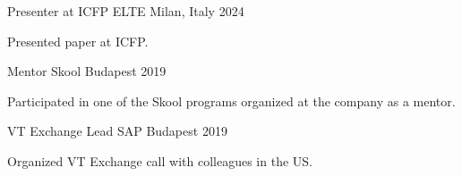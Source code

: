 

\begin{cventries}

  \cventry
    {Presenter at ICFP} %
    {ELTE}
    {Milan, Italy} %
    {2024} %
    {
      \begin{cvitems} %
        \item {Presented paper at ICFP.}
      \end{cvitems}
    }

  \cventry
    {Mentor} %
    {Skool} %
    {Budapest} %
    {2019} %
    {
      \begin{cvitems} %
        \item {Participated in one of the Skool programs organized at the company as a mentor.}
      \end{cvitems}
    }

  \cventry
    {VT Exchange Lead} %
    {SAP} %
    {Budapest} %
    {2019} %
    {
      \begin{cvitems} %
        \item {Organized VT Exchange call with colleagues in the US.}
      \end{cvitems}
    }

\end{cventries}
